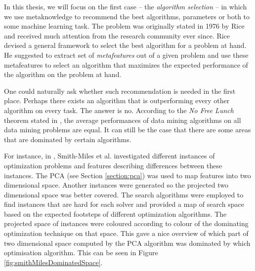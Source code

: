 In this thesis, we will focus on the first case -- the \emph{algorithm selection} -- in which we use metaknowledge to recommend the best algorithms, parameters or both to some machine learning task. The problem was originally stated in 1976 by Rice \cite{1976RiceAlgorithmSelectionProblem} and received much attention from the research community ever since. Rice devised a general framework to select the best algorithm for a problem at hand. He suggested to extract set of \emph{metafeatures} out of a given problem and use these metafeatures to select an algorithm that maximizes the expected performance of the algorithm on the problem at hand.

One could naturally ask whether such recommendation is needed in the first place. Perhaps there exists an algorithm that is outperforming every other algorithm on every task. The answer is no. According to the \emph{No Free Lunch} theorem stated in \cite{NoFreeLunchTheorem}, the average performances of data mining algorithms on all data mining problems are equal. It can still be the case that there are some areas that are dominated by certain algorithms.

For instance, in \cite{SmithMilesTowardsMeasuresOfAlgorithmPerformance}, Smith-Miles et al. investigated different instances of optimization problems and features describing differences between these instances. The PCA (see Section \ref{section:pca}) was used to map features into two dimensional space.
Another instances were generated so the projected two dimensional space was better covered. The search algorithms were employed to find instances that are hard for each solver and provided a map of search space based on the expected footsteps of different optimization algorithms. The projected space of instances were coloured
according to colour of the dominating optimization technique on that space. This gave a nice overview of which part of two dimensional space computed by the PCA algorithm was dominated by which optimisation algorithm. This can be seen in Figure \ref{fig:smithMilesDominatedSpace}.

